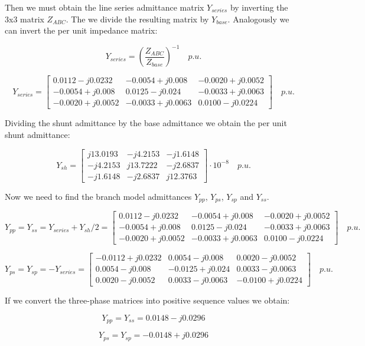 \documentclass[a4paper,twoside,fleqn]{tufte-book}
\begin{document}
Then we must obtain the line series admittance matrix $Y_{series}$ by inverting the 3x3 matrix $Z_{ABC}$. The we divide the resulting matrix by $Y_{base}$. Analogously we can invert the per unit impedance matrix:

$$
Y_{series} = \left(\frac{Z_{ABC}}{Z_{base}}\right)^{-1} \quad p.u.
$$

$$
Y_{series} = \left[ \begin{array}{ccc}
0.0112-j0.0232  & -0.0054+j0.008   & -0.0020+j0.0052 \\ -0.0054+j0.008  &  0.0125-j0.024 & -0.0033+j0.0063 \\ -0.0020+j0.0052 &  -0.0033+j0.0063 & 0.0100-j0.0224
\end{array} \right]\quad  p.u.
$$

Dividing the shunt admittance by the base admittance we obtain the per unit shunt admittance:

$$
Y_{sh} = \left[ \begin{array}{ccc}
j13.0193 & -j4.2153 &  -j1.6148 \\
-j4.2153 & j13.7222 & -j2.6837 \\ 
-j1.6148 & -j2.6837 & j12.3763
\end{array} \right] \cdot 10^{-8}  \quad p.u.
$$

Now we need to find the branch model admittances $Y_{pp}$, $Y_{ps}$, $Y_{sp}$ and $Y_{ss}$.

$$
Y_{pp} = Y_{ss} = Y_{series} + Y_{sh}/2 = \left[ \begin{array}{ccc}
0.0112-j0.0232  & -0.0054+j0.008   & -0.0020+j0.0052 \\ -0.0054+j0.008  &  0.0125-j0.024 & -0.0033+j0.0063 \\ -0.0020+j0.0052 &  -0.0033+j0.0063 & 0.0100-j0.0224
\end{array} \right]\quad  p.u.
$$

$$
Y_{ps} = Y_{sp} = -Y_{series} = \left[ \begin{array}{ccc}
-0.0112+j0.0232  & 0.0054-j0.008   & 0.0020-j0.0052 \\  0.0054-j0.008  &  -0.0125+j0.024 & 0.0033-j0.0063 \\  0.0020-j0.0052 &  0.0033-j0.0063 & -0.0100+j0.0224
\end{array} \right]\quad  p.u.
$$

If we convert the three-phase matrices into positive sequence values we obtain:

$$
Y_{pp} = Y_{ss} = 0.0148 -j0.0296
$$

$$
Y_{ps} = Y_{sp} = -0.0148 +j0.0296
$$
\end{document}
